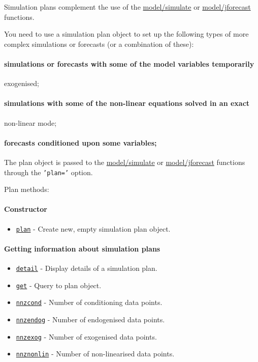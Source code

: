 

	Simulation plans complement the use of the \url{model/simulate} or
 \url{model/jforecast} functions.
 
 You need to use a simulation plan object to set up the following types
 of more complex simulations or forecasts (or a combination of these):
 
 \paragraph{simulations or forecasts with some of the model variables
 temporarily}
 
 exogenised;
 
 \paragraph{simulations with some of the non-linear equations solved in
 an exact}
 
 non-linear mode;
 
 \paragraph{forecasts conditioned upon some variables;}
 
 The plan object is passed to the \url{model/simulate} or
 \url{model/jforecast} functions through the \texttt{'plan='} option.
 
 Plan methods:
 
 \paragraph{Constructor}
 
 \begin{itemize}
 \item
   \href{plan/plan}{\texttt{plan}} - Create new, empty simulation plan
   object.
 \end{itemize}
 
 \paragraph{Getting information about simulation plans}
 
 \begin{itemize}
 \item
   \href{plan/detail}{\texttt{detail}} - Display details of a simulation
   plan.
 \item
   \href{plan/get}{\texttt{get}} - Query to plan object.
 \item
   \href{plan/nnzcond}{\texttt{nnzcond}} - Number of conditioning data
   points.
 \item
   \href{plan/nnzendog}{\texttt{nnzendog}} - Number of endogenised data
   points.
 \item
   \href{plan/nnzexog}{\texttt{nnzexog}} - Number of exogenised data
   points.
 \item
   \href{plan/nnznonlin}{\texttt{nnznonlin}} - Number of non-linearised
   data points.
 \end{itemize}
 
